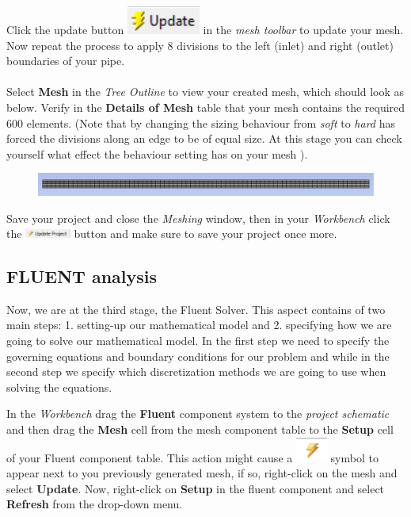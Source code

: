 \documentclass[11pt,a4paper,oneside,hidelinks]{scrartcl}
\newcommand\bfr[1]{\textcolor[rgb]{1,0.00,0.00}{\textbf{\textsf{#1}}}}
\begin{document}
Click the update button \includegraphics[width=1.cm]{update_button.png} in the \emph{mesh toolbar} to update your mesh. Now repeat the process to apply 8 divisions to the left (inlet) and right (outlet) boundaries of your pipe.
\\
\\
Select \bfr{Mesh} in the \emph{Tree Outline} to view your created mesh, which should look as below. Verify in the \bfr{Details of Mesh} table that your mesh contains the required 600 elements. (Note that by changing the sizing behaviour from \emph{soft} to \emph{hard} has forced the divisions along an edge to be of equal size. At this stage you can check yourself what effect the behaviour setting has on your mesh ).


\begin{figure}[H]
\begin{center}
\includegraphics[width=1.0\textwidth,clip]{laminar_mesh.png}
\end{center}
\end{figure}

Save your project and close the \emph{Meshing} window, then in your \emph{Workbench} click the \includegraphics[width=1.5cm]{update_project.png} button and make sure to save your project once more.

\FloatBarrier

\subsection{FLUENT analysis}
Now, we are at the third stage, the Fluent Solver. This aspect contains of two main steps: 1. setting-up our mathematical model and 2. specifying how we are going to solve our mathematical model.
In the first step we need to specify the governing equations and boundary conditions for our problem and while in the second step we specify which discretization methods we are going to use when solving the equations.

In the \emph{Workbench} drag the \bfr{Fluent} component system to the \emph{project schematic} and then drag the \bfr{Mesh} cell from the mesh component table to the \bfr{Setup} cell of your Fluent component table. This action might cause a \includegraphics[width=.4cm]{lightning_symbol.png} symbol to appear next to you previously generated mesh, if so, right-click on the mesh and select \bfr{Update}. Now, right-click on \bfr{Setup} in the fluent component and select \bfr{Refresh} from the drop-down menu.
\end{document}
